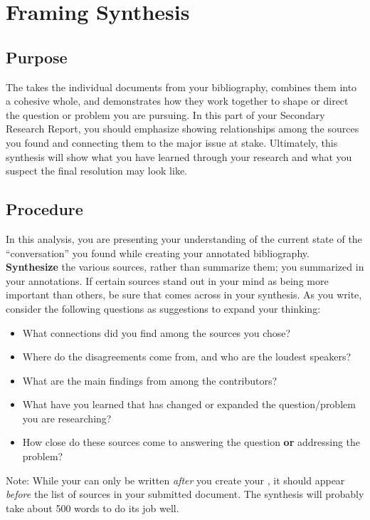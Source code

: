 \documentclass[11pt, oneside]{amsart}	%
\begin{document}
\clearpage
\section{Framing Synthesis} %
\label{sec:framing_synthesis}

\subsection{Purpose} %
\label{sec:synth-purpose}
The  takes the individual documents from your bibliography, combines them into a cohesive whole, and demonstrates how they work together to shape or direct the question or problem you are pursuing. In this part of your Secondary Research Report, you should emphasize showing relationships among the sources you found and connecting them to the major issue at stake. Ultimately, this synthesis will show what you have learned through your research and what you suspect the final resolution may look like.

\subsection{Procedure} %
\label{sec:synth-procedure}
In this analysis, you are presenting your understanding of the current state of the “conversation” you found while creating your annotated bibliography. \textbf{Synthesize} the various sources, rather than summarize them; you summarized in your annotations. If certain sources stand out in your mind as being more important than others, be sure that comes across in your synthesis. As you write, consider the following questions as suggestions to expand your thinking:
\begin{itemize}
	\item What connections did you find among the sources you chose?
	\item Where do the disagreements come from, and who are the loudest speakers?
	\item What are the main findings from among the contributors?
	\item  What have you learned that has changed or expanded the question/problem you are researching?
	\item  How close do these sources come to answering the question \textbf{or} addressing the problem?
\end{itemize}

Note: While your  can only be written \emph{after} you create your , it should appear \emph{before} the list of sources in your submitted document. The synthesis will probably take about 500 words to do its job well.
\end{document}
